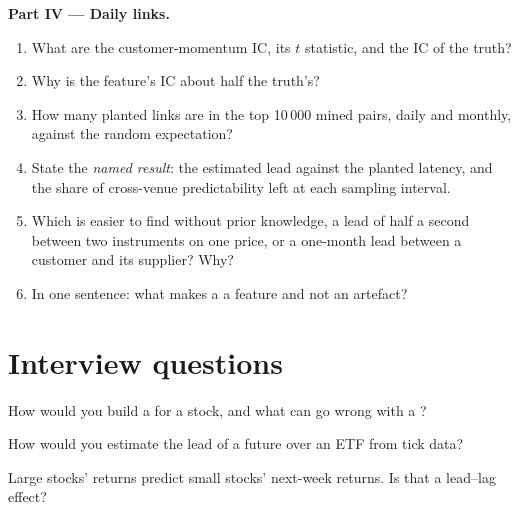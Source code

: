 \begin{problem}
\medskip\noindent\textbf{Part IV --- Daily links.}
\begin{enumerate}[resume]
\item What are the customer-momentum IC, its $t$ statistic, and the IC of the truth?
\item Why is the feature's IC about half the truth's?
\item How many planted links are in the top 10\,000 mined pairs, daily and monthly, against the random expectation?
\item State the \emph{named result}: the estimated lead against the planted latency, and the share of cross-venue predictability left at
each sampling interval.
\item Which is easier to find without prior knowledge, a lead of half a second between two instruments on one price, or a one-month lead
between a customer and its supplier? Why?
\item In one sentence: what makes a  a feature and not an artefact?
\end{enumerate}
\end{problem}

\section{Interview questions}

\begin{interviewq}\label{iq:rs:cross-sectional-and-cross-asset-features:1}
How would you build a  for a stock, and what can go wrong with a ?
\end{interviewq}

\begin{interviewq}\label{iq:rs:cross-sectional-and-cross-asset-features:2}
How would you estimate the lead of a future over an ETF from tick data?
\end{interviewq}

\begin{interviewq}\label{iq:rs:cross-sectional-and-cross-asset-features:3}
Large stocks' returns predict small stocks' next-week returns. Is that a lead--lag effect?
\end{interviewq}

